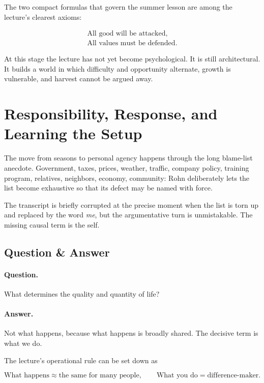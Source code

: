 The two compact formulas that govern the summer lesson are among the lecture's clearest axioms:

\begin{align}
\text{All good will be attacked},\\
\text{All values must be defended}.
\end{align}

At this stage the lecture has not yet become psychological. It is still architectural. It builds a world in which difficulty and opportunity alternate, growth is vulnerable, and harvest cannot be argued away.

\section{Responsibility, Response, and Learning the Setup}

The move from seasons to personal agency happens through the long blame-list anecdote. Government, taxes, prices, weather, traffic, company policy, training program, relatives, neighbors, economy, community: Rohn deliberately lets the list become exhaustive so that its defect may be named with force.

\begin{remark}
The transcript is briefly corrupted at the precise moment when the list is torn up and replaced by the word \emph{me}, but the argumentative turn is unmistakable. The missing causal term is the self.
\end{remark}

\subsection{Question \& Answer}

\paragraph{Question.} What determines the quality and quantity of life?

\paragraph{Answer.} Not what happens, because what happens is broadly shared. The decisive term is what we do.

The lecture's operational rule can be set down as

\begin{equation}
\text{What happens} \approx \text{the same for many people}, \qquad \text{What you do}=\text{difference-maker}.
\end{equation}

